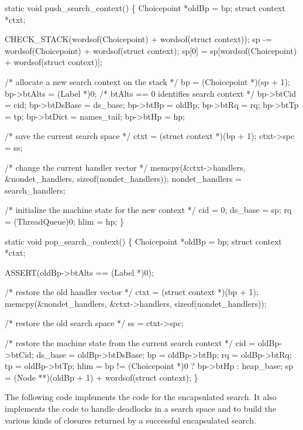 \nwenddocs{}\plusendmoddef\nwstartdeflinemarkup{}\nwenddeflinemarkup
static void
push_search_context()
\{
    Choicepoint    *oldBp = bp;
    struct context *ctxt;

    CHECK_STACK(wordsof(Choicepoint) + wordsof(struct context));
    sp   -= wordsof(Choicepoint) + wordsof(struct context);
    sp[0] = sp[wordsof(Choicepoint) + wordsof(struct context)];

    /* allocate a new search context on the stack */
    bp             = (Choicepoint *)(sp + 1);
    bp->btAlts     = (Label *)0; /* btAlts == 0 identifies search context */
    bp->btCid      = cid;
    bp->btDsBase   = ds_base;
    bp->btBp       = oldBp;
    bp->btRq       = rq;
    bp->btTp       = tp;
    bp->btDict     = names_tail;
    bp->btHp       = hp;

    /* save the current search space */
    ctxt      = (struct context *)(bp + 1);
    ctxt->spc = ss;

    /* change the current handler vector */
    memcpy(&ctxt->handlers, &nondet_handlers, sizeof(nondet_handlers));
    nondet_handlers = search_handlers;

    /* initialize the machine state for the new context */
    cid     = 0;
    ds_base = sp;
    rq      = (ThreadQueue)0;
    hlim    = hp;
\}

static void
pop_search_context()
\{
    Choicepoint    *oldBp = bp;
    struct context *ctxt;

    ASSERT(oldBp->btAlts == (Label *)0);

    /* restore the old handler vector */
    ctxt = (struct context *)(bp + 1);
    memcpy(&nondet_handlers, &ctxt->handlers, sizeof(nondet_handlers));

    /* restore the old search space */
    ss = ctxt->spc;

    /* restore the machine state from the current search context */
    cid     = oldBp->btCid;
    ds_base = oldBp->btDsBase;
    bp      = oldBp->btBp;
    rq      = oldBp->btRq;
    tp      = oldBp->btTp;
    hlim    = bp != (Choicepoint *)0 ? bp->btHp : heap_base;
    sp      = (Node **)(oldBp + 1) + wordsof(struct context);
\}

\nwendcode{}\nwdocspar
The following code implements the code for the encapsulated search. It
also implements the code to handle deadlocks in a search space and to
build the various kinds of closures returned by a successful
encapsulated search.

